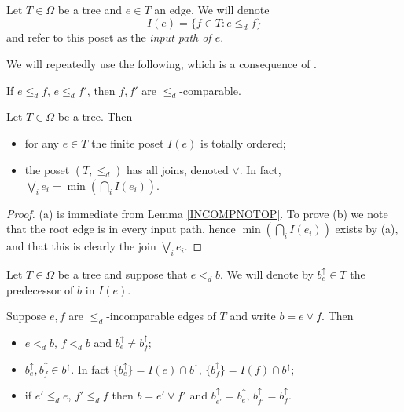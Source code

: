 \documentclass[a4paper,10pt]{article}%
\begin{document}
\begin{notation}\label{INPUTPATH NOT}
	Let $T \in \Omega$ be a tree and $e \in T$ an edge. We will denote
	\[ I(e) =\{f \in T \colon e \leq_d f \} \]
and refer to this poset as the \textit{input path of $e$}.
\end{notation}

We will repeatedly use the following, which is a consequence of \cite[Cor. 5.26]{Pe17}.

\begin{lemma}\label{INCOMPNOTOP}
If $e \leq_d f$, $e \leq_d f'$, then $f,f'$ are $\leq_d$-comparable. 
\end{lemma}


\begin{proposition}\label{INPUTPATHS PROP}
	Let $T \in \Omega$ be a tree. Then
	\begin{itemize}
		\item[(a)] for any $e \in T$ the finite poset $I(e)$ is totally ordered;
		\item[(b)] the poset $(T,\leq_d)$ has all joins, denoted $\vee$. In fact, $\bigvee_{i} e_i = \min (\bigcap_{i} I(e_i))$.
	\end{itemize}
\end{proposition}

\begin{proof}
	(a) is immediate from Lemma \ref{INCOMPNOTOP}.
        To prove (b) we note that
        the root edge is in every input path, hence
	$\min (\bigcap_{i} I(e_i))$ exists by (a), and that this is clearly the join $\bigvee_i {e_i}$.
\end{proof}


\begin{notation}
	Let $T \in \Omega$ be a tree and suppose that $e <_d b$. We will denote by $b^{\uparrow}_e \in T$ the predecessor of $b$ in $I(e)$.
\end{notation}


\begin{proposition}\label{INPUTPREDECESSORPROP PROP}
Suppose $e,f$ are $\leq_d$-incomparable edges of $T$ and write $b= e \vee f$. Then
\begin{itemize}
\item [(a)] $e <_d b$, $f<_d b$ and $b^{\uparrow}_e \neq b^{\uparrow}_f$;
\item [(b)] $b^{\uparrow}_e, b^{\uparrow}_f \in b^{\uparrow}$. In fact $\{b^{\uparrow}_e\} = I(e) \cap b^{\uparrow}$,
$\{b^{\uparrow}_f\} = I(f) \cap b^{\uparrow}$;
\item[(c)] if $e' \leq_d e$, $f' \leq_d f$ then 
$b = e' \vee f'$ and $b^{\uparrow}_{e'} = b^{\uparrow}_{e}$, $b^{\uparrow}_{f'} = b^{\uparrow}_{f}$.
\end{itemize}
\end{proposition}
\end{document}
